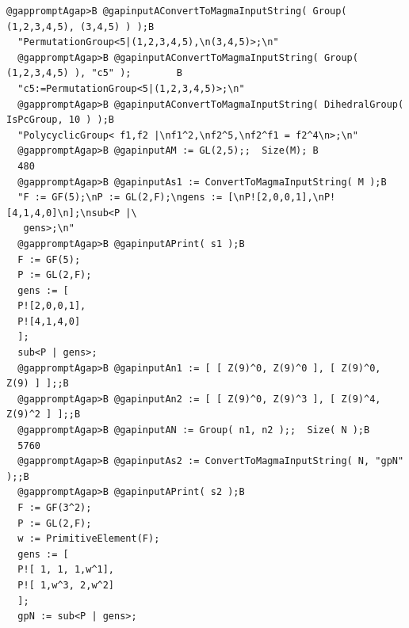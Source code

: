 \documentclass[a4paper,11pt]{report}
\begin{document}
{{\begin{Verbatim}[commandchars=@AB,fontsize=\small,frame=single,label=Example]
  @gappromptAgap>B @gapinputAConvertToMagmaInputString( Group( (1,2,3,4,5), (3,4,5) ) );B
  "PermutationGroup<5|(1,2,3,4,5),\n(3,4,5)>;\n"
  @gappromptAgap>B @gapinputAConvertToMagmaInputString( Group( (1,2,3,4,5) ), "c5" );        B
  "c5:=PermutationGroup<5|(1,2,3,4,5)>;\n"
  @gappromptAgap>B @gapinputAConvertToMagmaInputString( DihedralGroup( IsPcGroup, 10 ) );B
  "PolycyclicGroup< f1,f2 |\nf1^2,\nf2^5,\nf2^f1 = f2^4\n>;\n"
  @gappromptAgap>B @gapinputAM := GL(2,5);;  Size(M); B
  480
  @gappromptAgap>B @gapinputAs1 := ConvertToMagmaInputString( M );B
  "F := GF(5);\nP := GL(2,F);\ngens := [\nP![2,0,0,1],\nP![4,1,4,0]\n];\nsub<P |\
   gens>;\n"
  @gappromptAgap>B @gapinputAPrint( s1 );B
  F := GF(5);
  P := GL(2,F);
  gens := [
  P![2,0,0,1],
  P![4,1,4,0]
  ];
  sub<P | gens>;
  @gappromptAgap>B @gapinputAn1 := [ [ Z(9)^0, Z(9)^0 ], [ Z(9)^0, Z(9) ] ];;B
  @gappromptAgap>B @gapinputAn2 := [ [ Z(9)^0, Z(9)^3 ], [ Z(9)^4, Z(9)^2 ] ];;B
  @gappromptAgap>B @gapinputAN := Group( n1, n2 );;  Size( N );B
  5760
  @gappromptAgap>B @gapinputAs2 := ConvertToMagmaInputString( N, "gpN" );;B
  @gappromptAgap>B @gapinputAPrint( s2 );B
  F := GF(3^2);
  P := GL(2,F);
  w := PrimitiveElement(F);
  gens := [
  P![ 1, 1, 1,w^1],
  P![ 1,w^3, 2,w^2]
  ];
  gpN := sub<P | gens>;
  
\end{Verbatim}
 }

 }

         
\end{document}
